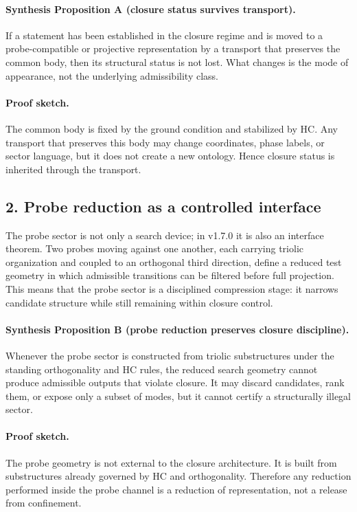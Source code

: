 \paragraph{Synthesis Proposition A (closure status survives transport).}
If a statement has been established in the closure regime and is moved to a
probe-compatible or projective representation by a transport that preserves the
common body, then its structural status is not lost. What changes is the mode of
appearance, not the underlying admissibility class.

\paragraph{Proof sketch.}
The common body is fixed by the ground condition and stabilized by HC. Any
transport that preserves this body may change coordinates, phase labels, or
sector language, but it does not create a new ontology. Hence closure status is
inherited through the transport.

\subsection*{2. Probe reduction as a controlled interface}
The probe sector is not only a search device; in v1.7.0 it is also an
interface theorem. Two probes moving against one another, each carrying triolic
organization and coupled to an orthogonal third direction, define a reduced test
geometry in which admissible transitions can be filtered before full projection.
This means that the probe sector is a disciplined compression stage: it narrows
candidate structure while still remaining within closure control.

\paragraph{Synthesis Proposition B (probe reduction preserves closure discipline).}
Whenever the probe sector is constructed from triolic substructures under the
standing orthogonality and HC rules, the reduced search geometry cannot produce
admissible outputs that violate closure. It may discard candidates, rank them,
or expose only a subset of modes, but it cannot certify a structurally illegal
sector.

\paragraph{Proof sketch.}
The probe geometry is not external to the closure architecture. It is built from
substructures already governed by HC and orthogonality. Therefore any reduction
performed inside the probe channel is a reduction of representation, not a
release from confinement.

